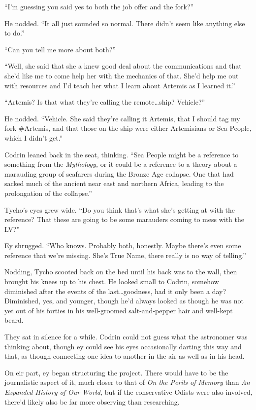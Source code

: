 ``I'm guessing you said yes to both the job offer and the fork?''

He nodded. ``It all just sounded so normal. There didn't seem like anything else to do.''

``Can you tell me more about both?''

``Well, she said that she a knew good deal about the communications and that she'd like me to come help her with the mechanics of that. She'd help me out with resources and I'd teach her what I learn about Artemis as I learned it.''

``Artemis? Is that what they're calling the remote\ldots ship? Vehicle?''

He nodded. ``Vehicle. She said they're calling it Artemis, that I should tag my fork \#Artemis, and that those on the ship were either Artemisians or Sea People, which I didn't get.''

Codrin leaned back in the seat, thinking. ``Sea People might be a reference to something from the \emph{Mythology,} or it could be a reference to a theory about a marauding group of seafarers during the Bronze Age collapse. One that had sacked much of the ancient near east and northern Africa, leading to the prolongation of the collapse.''

Tycho's eyes grew wide. ``Do you think that's what she's getting at with the reference? That these are going to be some marauders coming to mess with the LV?''

Ey shrugged. ``Who knows. Probably both, honestly. Maybe there's even some reference that we're missing. She's True Name, there really is no way of telling.''

Nodding, Tycho scooted back on the bed until his back was to the wall, then brought his knees up to his chest. He looked small to Codrin, somehow diminished after the events of the last\ldots goodness, had it only been a day? Diminished, yes, and younger, though he'd always looked as though he was not yet out of his forties in his well-groomed salt-and-pepper hair and well-kept beard.

They sat in silence for a while. Codrin could not guess what the astronomer was thinking about, though ey could see his eyes occasionally darting this way and that, as though connecting one idea to another in the air as well as in his head.

On eir part, ey began structuring the project. There would have to be the journalistic aspect of it, much closer to that of \emph{On the Perils of Memory} than \emph{An Expanded History of Our World,} but if the conservative Odists were also involved, there'd likely also be far more observing than researching.

